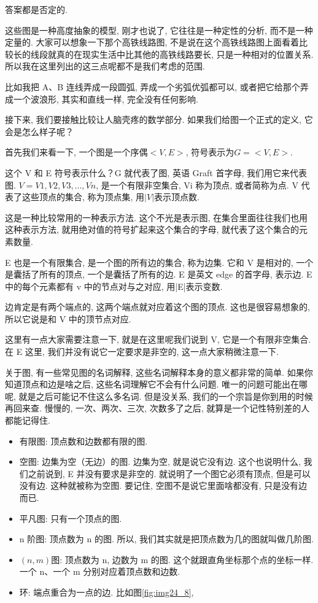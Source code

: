 答案都是否定的. 

这些图是一种高度抽象的模型, 刚才也说了, 它往往是一种定性的分析, 而不是一种定量的. 大家可以想象一下那个高铁线路图, 不是说在这个高铁线路图上面看着比较长的线段就真的在现实生活中比其他的高铁线路要长, 只是一种相对的位置关系. 所以我在这里列出的这三点呢都不是我们考虑的范围. 

比如我把 A、B 连线弄成一段圆弧, 弄成一个劣弧优弧都可以, 或者把它给那个弄成一个波浪形, 其实和直线一样, 完全没有任何影响. 

接下来, 我们要接触比较让人脑壳疼的数学部分. 如果我们给图一个正式的定义, 它会是怎么样子呢？

首先我们来看一下, 一个图是一个序偶$<V,E>$, 符号表示为$G = <V, E>$. 

这个 V 和 E 符号表示什么？G 就代表了图, 英语 Graft 首字母, 我们用它来代表图. \(V = {V1, V2, V3, ..., Vn}\), 是一个有限非空集合, Vi 称为顶点, 或者简称为点. V 代表了这些顶点的集合, 称为顶点集,  用\(|V|\)表示顶点数. 

这是一种比较常用的一种表示方法. 这个不光是表示图, 在集合里面往往我们也用这种表示方法, 就用绝对值的符号扩起来这个集合的字母, 就代表了这个集合的元素数量. 

E 也是一个有限集合, 是一个图的所有边的集合, 称为边集. 它和 V 是相对的, 一个是囊括了所有的顶点, 一个是囊括了所有的边. E 是英文 edge 的首字母, 表示边. E 中的每个元素都有 v 中的节点对与之对应, 用|E|表示变数. 

边肯定是有两个端点的, 这两个端点就对应着这个图的顶点. 这也是很容易想象的, 所以它说是和 V 中的顶节点对应. 

这里有一点大家需要注意一下, 就是在这里呢我们说到 V, 它是一个有限非空集合. 在 E 这里, 我们并没有说它一定要求是非空的, 这一点大家稍微注意一下. 

关于图, 有一些常见图的名词解释, 这些名词解释本身的意义都非常的简单. 如果你知道顶点和边是啥之后, 这些名词理解它不会有什么问题. 唯一的问题可能出在哪呢, 就是之后可能记不住这么多名词. 但是没关系, 我们的一个宗旨是你到用的时候再回来查. 慢慢的, 一次、两次、三次, 次数多了之后, 就算是一个记性特别差的人都能记得住. 

\begin{itemize}
  \item 有限图: 顶点数和边数都有限的图. 
  \item 空图: 边集为空（无边）的图. 边集为空, 就是说它没有边. 这个也说明什么, 我们之前说到, E 并没有要求是非空的. 就说明了一个图它必须有顶点, 但是可以没有边. 这种就被称为空图. 要记住, 空图不是说它里面啥都没有, 只是没有边而已. 
  \item 平凡图: 只有一个顶点的图. 
  \item n 阶图: 顶点数为 n 的图. 所以, 我们其实就是把顶点数为几的图就叫做几阶图. 
  \item $(n,m)$图: 顶点数为 n, 边数为 m 的图. 这个就跟直角坐标那个点的坐标一样. 一个 n、一个 m 分别对应着顶点数和边数. 
  \item 环: 端点重合为一点的边. 比如图\ref{fig:img24_8}, 
\end{itemize}

